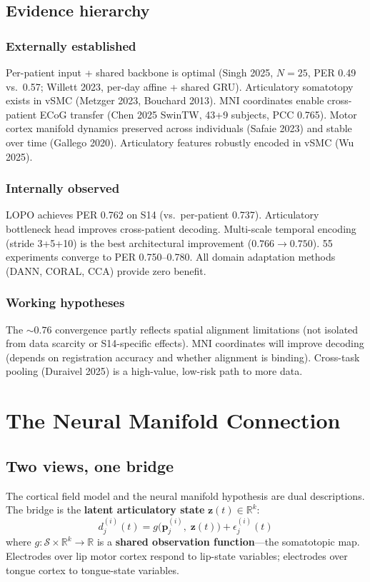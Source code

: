 \documentclass[11pt,letterpaper]{article}
\newcommand{\bfp}{\mathbf{p}}
\newcommand{\bfz}{\mathbf{z}}
\newcommand{\cS}{\mathcal{S}}
\newcommand{\R}{\mathbb{R}}
\begin{document}
\subsection{Evidence hierarchy}

\subsubsection{Externally established}
Per-patient input + shared backbone is optimal (Singh 2025, $N{=}25$, PER 0.49 vs.\ 0.57; Willett 2023, per-day affine + shared GRU). Articulatory somatotopy exists in vSMC (Metzger 2023, Bouchard 2013). MNI coordinates enable cross-patient ECoG transfer (Chen 2025 SwinTW, 43+9 subjects, PCC 0.765). Motor cortex manifold dynamics preserved across individuals (Safaie 2023) and stable over time (Gallego 2020). Articulatory features robustly encoded in vSMC (Wu 2025).

\subsubsection{Internally observed}
LOPO achieves PER 0.762 on S14 (vs.\ per-patient 0.737). Articulatory bottleneck head improves cross-patient decoding. Multi-scale temporal encoding (stride 3+5+10) is the best architectural improvement ($0.766 \to 0.750$). 55 experiments converge to PER 0.750--0.780. All domain adaptation methods (DANN, CORAL, CCA) provide zero benefit.

\subsubsection{Working hypotheses}
The ${\sim}0.76$ convergence partly reflects spatial alignment limitations (not isolated from data scarcity or S14-specific effects). MNI coordinates will improve decoding (depends on registration accuracy and whether alignment is binding). Cross-task pooling (Duraivel 2025) is a high-value, low-risk path to more data.


\section{The Neural Manifold Connection}\label{sec:manifold}

\subsection{Two views, one bridge}

The cortical field model and the neural manifold hypothesis are dual descriptions. The bridge is the \textbf{latent articulatory state} $\bfz(t) \in \R^k$:
\begin{equation}\label{eq:obs-function}
\boxed{d_j^{(i)}(t) = g\bigl(\bfp_j^{(i)},\; \bfz(t)\bigr) + \epsilon_j^{(i)}(t)}
\end{equation}
where $g: \cS \times \R^k \to \R$ is a \textbf{shared observation function}---the somatotopic map. Electrodes over lip motor cortex respond to lip-state variables; electrodes over tongue cortex to tongue-state variables.
\end{document}
